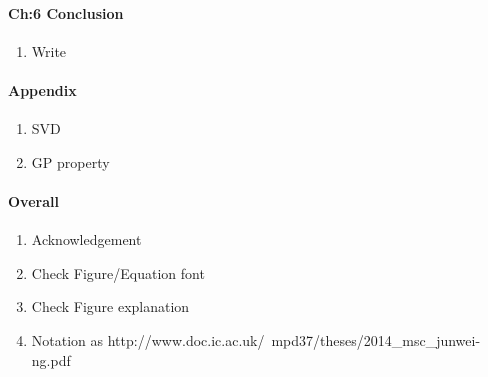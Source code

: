 \documentclass[a4paper,10pt]{article}
\begin{document}
\paragraph{Ch:6 Conclusion}
\begin{enumerate}
 \item Write
\end{enumerate}

\paragraph{Appendix}
\begin{enumerate}
 \item SVD
 \item GP property
\end{enumerate}

\paragraph{Overall}
\begin{enumerate}
 \item Acknowledgement 
 \item Check Figure/Equation font
 \item Check Figure explanation
 \item Notation as http://www.doc.ic.ac.uk/~mpd37/theses/2014_msc_junwei-ng.pdf
\end{enumerate}
\end{document}

